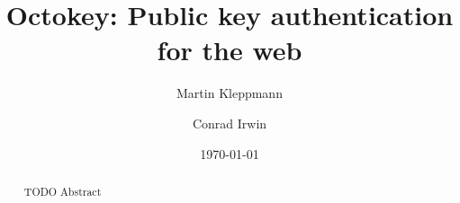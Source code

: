 \documentclass{article}
\begin{document}
\title{Octokey: Public key authentication for the web}
\author{Martin Kleppmann \and Conrad Irwin}
\date{\today}
\maketitle

\begin{abstract}
TODO Abstract
\end{abstract}





{}

\end{document}
